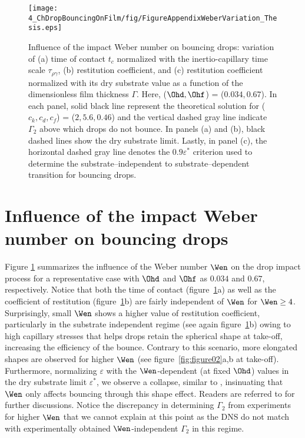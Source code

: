 \begin{subappendices}
	\begin{sidewaysfigure}
		\centering
		\texttt{[image: 4\_ChDropBouncingOnFilm/fig/FigureAppendixWeberVariation\_Thesis.eps]}
		\caption{Influence of the impact Weber number on bouncing drops: variation of (a) time of contact $t_c$ normalized with the inertio-capillary time scale $\tau_{\rho\gamma}$, (b) restitution coefficient, and (c) restitution coefficient normalized with its dry substrate value as a function of the dimensionless film thickness $\Gamma$. Here, ($\Ohd, \Ohf$) = ($0.034, 0.67$). In each panel, solid black line represent the theoretical solution for ($c_k, c_d, c_f$) = ($2, 5.6, 0.46$) and the vertical dashed gray line indicate $\Gamma_2$ above which drops do not bounce. In panels (a) and (b), black dashed lines show the dry substrate limit. Lastly, in panel (c), the horizontal dashed gray line denotes the $0.9\varepsilon^*$ criterion used to determine the substrate--independent to substrate--dependent transition for bouncing drops.}
		\label{fig:appendix_WeberVariation}
	\end{sidewaysfigure}

	\section{Influence of the impact Weber number on bouncing drops}
	\label{sec:weber_influence}
	
	Figure \ref{fig:appendix_WeberVariation} summarizes the influence of the Weber number $\Wen$ on the drop impact process for a representative case with $\Ohd$ and $\Ohf$ as $0.034$ and $0.67$, respectively. Notice that both the time of contact (figure~\ref{fig:appendix_WeberVariation}a) as well as the coefficient of restitution (figure~\ref{fig:appendix_WeberVariation}b) are fairly independent of $\Wen$ for $\Wen \ge 4$. Surprisingly, small $\Wen$ shows a higher value of restitution coefficient, particularly in the substrate independent regime (see again figure~\ref{fig:appendix_WeberVariation}b) owing to high capillary stresses that helps drops retain the spherical shape at take-off, increasing the efficiency of the bounce. Contrary to this scenario, more elongated shapes are observed for higher $\Wen$ (see figure~\ref{fig:figure02}a,b at take-off). Furthermore, normalizing $\varepsilon$ with the $\Wen$-dependent (at fixed $\Ohd$) values in the dry substrate limit $\varepsilon^*$, we observe a collapse, similar to \citet{jha2020viscous}, insinuating that $\Wen$ only affects bouncing through this shape effect. Readers are referred to \citet{vatsalInProgressViscous} for further discussions. Notice the discrepancy in determining $\Gamma_2$ from experiments for higher $\Wen$ that we cannot explain at this point as the DNS do not match with experimentally obtained $\Wen$-independent $\Gamma_2$ in this regime.
	

\end{subappendices}
